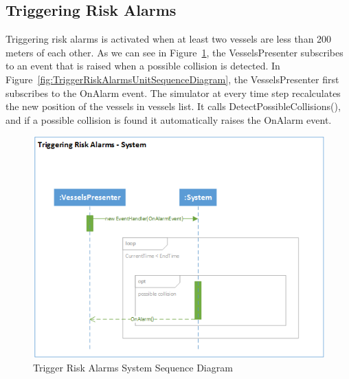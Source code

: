 \documentclass[12pt]{article}
\begin{document}
\clearpage

\subsection{Triggering Risk Alarms}

Triggering risk alarms is activated when at least two vessels are less than 200 meters of each other. As we can see in Figure~\ref{fig:TriggerRiskAlarmsSystemSequenceDiagram}, the VesselsPresenter subscribes to an event that is raised when a possible collision is detected. In Figure~\ref{fig:TriggerRiskAlarmsUnitSequenceDiagram}, the VesselsPresenter first subscribes to the OnAlarm event. The simulator at every time step recalculates the new position of the vessels in vessels list. It calls DetectPossibleCollisions(), and if a possible collision is found it automatically raises the OnAlarm event.

\begin{figure}[h!]
    \centering
    \includegraphics[scale=0.85]{4_triggering_risk_alarms_system}
    \caption{Trigger Risk Alarms System Sequence Diagram}
    \label{fig:TriggerRiskAlarmsSystemSequenceDiagram}
\end{figure}

\clearpage
\end{document}
